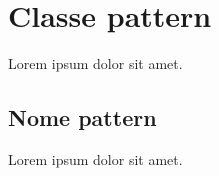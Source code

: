 \documentclass{scrreprt}
\begin{document}

\section{Classe pattern}
Lorem ipsum dolor sit amet.


\subsection{Nome pattern}
Lorem ipsum dolor sit amet.







\pagebreak
\blankpage{}
\end{document}
